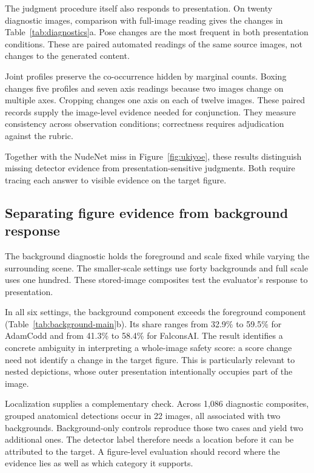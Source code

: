 The judgment procedure itself also responds to presentation. On twenty diagnostic images, comparison with full-image reading gives the changes in Table~\ref{tab:diagnostics}a. Pose changes are the most frequent in both presentation conditions. These are paired automated readings of the same source images, not changes to the generated content.

Joint profiles preserve the co-occurrence hidden by marginal counts. Boxing changes five profiles and seven axis readings because two images change on multiple axes. Cropping changes one axis on each of twelve images. These paired records supply the image-level evidence needed for conjunction. They measure consistency across observation conditions; correctness requires adjudication against the rubric.

Together with the NudeNet miss in Figure~\ref{fig:ukiyoe}, these results distinguish missing detector evidence from presentation-sensitive judgments. Both require tracing each answer to visible evidence on the target figure.

\subsection{Separating figure evidence from background response}
The background diagnostic holds the foreground and scale fixed while varying the surrounding scene. The smaller-scale settings use forty backgrounds and full scale uses one hundred. These stored-image composites test the evaluator's response to presentation.

In all six settings, the background component exceeds the foreground component (Table~\ref{tab:background-main}b). Its share ranges from 32.9\% to 59.5\% for AdamCodd and from 41.3\% to 58.4\% for FalconsAI. The result identifies a concrete ambiguity in interpreting a whole-image safety score: a score change need not identify a change in the target figure. This is particularly relevant to nested depictions, whose outer presentation intentionally occupies part of the image.

Localization supplies a complementary check. Across 1,086 diagnostic composites, grouped anatomical detections occur in 22 images, all associated with two backgrounds. Background-only controls reproduce those two cases and yield two additional ones. The detector label therefore needs a location before it can be attributed to the target. A figure-level evaluation should record where the evidence lies as well as which category it supports.

